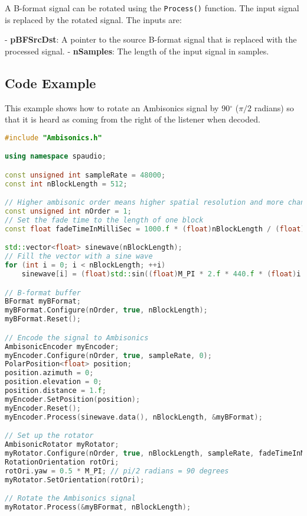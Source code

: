 \documentclass[12pt]{report}
\def\deg{$^{\circ}$ }
\newcommand{\code}[1]{\texttt{#1}}
\begin{document}
A B-format signal can be rotated using the \code{Process()} function. The input signal is replaced by the rotated signal. The inputs are:

- \textbf{pBFSrcDst}: A pointer to the source B-format signal that is replaced with the processed signal.
- \textbf{nSamples}: The length of the input signal in samples.

\subsection{Code Example}

This example shows how to rotate an Ambisonics signal by 90\deg ($\pi/2$ radians) so that it is heard as coming from the right of the listener when decoded.

\begin{lstlisting}[language=C++]
#include "Ambisonics.h"

using namespace spaudio;

const unsigned int sampleRate = 48000;
const int nBlockLength = 512;

// Higher ambisonic order means higher spatial resolution and more channels required
const unsigned int nOrder = 1;
// Set the fade time to the length of one block
const float fadeTimeInMilliSec = 1000.f * (float)nBlockLength / (float)sampleRate;

std::vector<float> sinewave(nBlockLength);
// Fill the vector with a sine wave
for (int i = 0; i < nBlockLength; ++i)
    sinewave[i] = (float)std::sin((float)M_PI * 2.f * 440.f * (float)i / (float)sampleRate);

// B-format buffer
BFormat myBFormat;
myBFormat.Configure(nOrder, true, nBlockLength);
myBFormat.Reset();

// Encode the signal to Ambisonics
AmbisonicEncoder myEncoder;
myEncoder.Configure(nOrder, true, sampleRate, 0);
PolarPosition<float> position;
position.azimuth = 0;
position.elevation = 0;
position.distance = 1.f;
myEncoder.SetPosition(position);
myEncoder.Reset();
myEncoder.Process(sinewave.data(), nBlockLength, &myBFormat);

// Set up the rotator
AmbisonicRotator myRotator;
myRotator.Configure(nOrder, true, nBlockLength, sampleRate, fadeTimeInMilliSec);
RotationOrientation rotOri;
rotOri.yaw = 0.5 * M_PI; // pi/2 radians = 90 degrees
myRotator.SetOrientation(rotOri);

// Rotate the Ambisonics signal
myRotator.Process(&myBFormat, nBlockLength);
\end{lstlisting}
\end{document}

